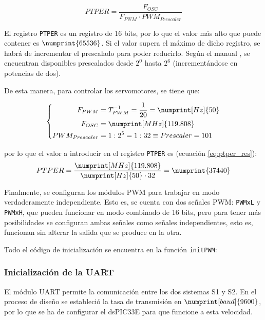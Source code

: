 \begin{equation}\label{eq:ptper}
    PTPER = \frac{F_{OSC}}{F_{PWM} \cdot PWM_{Prescaler}}
\end{equation}

El registro \texttt{PTPER} es un registro de 16 bits, por lo que el valor más alto
que puede contener es $\numprint{65536}$. Si el valor supera el máximo de dicho registro,
se habrá de incrementar el prescalado para poder reducirlo. Según el manual \cite{microchipDsPIC33EPIC24EFamily2011},
se encuentran disponibles prescalados desde $2^0$ hasta $2^6$ (incrementándose en
potencias de dos).

De esta manera, para controlar los servomotores, se tiene que:

\begin{equation*}
    \left\{
        \begin{aligned}
            F_{PWM} &= T_{PWM}^{-1} = \frac{1}{20} = \numprint[Hz]{50} \\
            F_{OSC} &= \numprint[MHz]{119.808} \\
            PWM_{Prescaler} &= 1:2^5 = 1:32 \equiv Prescaler=101
        \end{aligned}
    \right.
\end{equation*}

por lo que el valor a introducir en el registro \texttt{PTPER} es (ecuación \ref{eq:ptper_res}):
\begin{equation}\label{eq:ptper_res}
    PTPER = \frac{\numprint[MHz]{119.808}}{\numprint[Hz]{50} \cdot 32} = \numprint{37440}
\end{equation}

Finalmente, se configuran los módulos \ac{PWM} para trabajar en modo verdaderamente
independiente. Esto es, se cuenta con dos señales \ac{PWM}: \texttt{PWMxL} y \texttt{PWMxH},
que pueden funcionar en modo combinado de 16 bits, pero para tener más posibilidades
se configuran ambas señales como señales independientes, esto es, funcionan sin alterar
la salida que se produce en la otra.

Todo el código de inicialización se encuentra en la función \texttt{initPWM}:



\subsubsection{Inicialización de la \ac{UART}}
El módulo \ac{UART} permite la comunicación entre los dos sistemas \ac{S1} y \ac{S2}.
En el proceso de diseño se estableció la tasa de transmisión en $\numprint[baud]{9600}$,
por lo que se ha de configurar el dsPIC33E para que funcione a esta velocidad.

